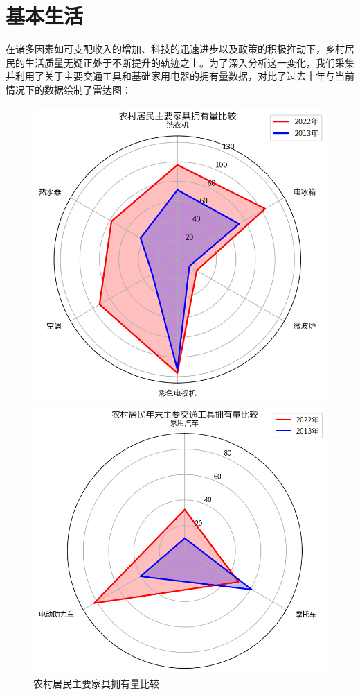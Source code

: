 \section{基本生活}

在诸多因素如可支配收入的增加、科技的迅速进步以及政策的积极推动下，乡村居民的生活质量无疑正处于不断提升的轨迹之上。为了深入分析这一变化，我们采集并利用了关于主要交通工具和基础家用电器的拥有量数据，对比了过去十年与当前情况下的数据绘制了雷达图：

\begin{figure}[H]
    \centering
    \begin{minipage}{0.43\textwidth}
        \centering
        \includegraphics[width=\linewidth]{figures/43.png}
        \caption{农村居民主要家具拥有量比较}
        \label{fig:furniture}
    \end{minipage}\hfill
    \begin{minipage}{0.43\textwidth}
        \centering
        \includegraphics[width=\linewidth]{figures/44.png}

\end{minipage}
\end{figure}

